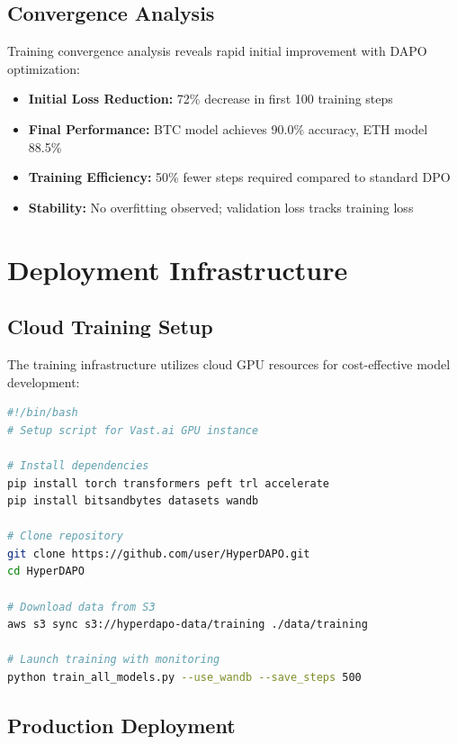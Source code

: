 \documentclass{report}
\begin{document}
\subsection{Convergence Analysis}

Training convergence analysis reveals rapid initial improvement with DAPO optimization:

\begin{itemize}
    \item \textbf{Initial Loss Reduction:} 72\% decrease in first 100 training steps
    \item \textbf{Final Performance:} BTC model achieves 90.0\% accuracy, ETH model 88.5\%
    \item \textbf{Training Efficiency:} 50\% fewer steps required compared to standard DPO
    \item \textbf{Stability:} No overfitting observed; validation loss tracks training loss
\end{itemize}

\section{Deployment Infrastructure}

\subsection{Cloud Training Setup}

The training infrastructure utilizes cloud GPU resources for cost-effective model development:

\begin{lstlisting}[language=Bash, caption=Cloud environment setup]
#!/bin/bash
# Setup script for Vast.ai GPU instance

# Install dependencies
pip install torch transformers peft trl accelerate
pip install bitsandbytes datasets wandb

# Clone repository
git clone https://github.com/user/HyperDAPO.git
cd HyperDAPO

# Download data from S3
aws s3 sync s3://hyperdapo-data/training ./data/training

# Launch training with monitoring
python train_all_models.py --use_wandb --save_steps 500
\end{lstlisting}

\subsection{Production Deployment}
\end{document}
